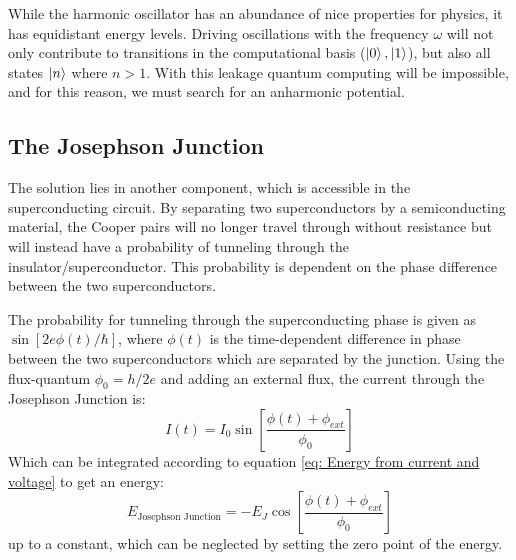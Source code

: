 While the harmonic oscillator has an abundance of nice properties for physics, it has equidistant energy levels. Driving oscillations with the frequency $\omega$ will not only contribute to transitions in the computational basis ($\ket{0}, \ket{1}$), but also all states $\ket{n}$ where $n > 1$. With this leakage quantum computing will be impossible, and for this reason, we must search for an anharmonic potential.

\subsection{The Josephson Junction}
The solution lies in another component, which is accessible in the superconducting circuit. By separating two superconductors by a semiconducting material, the Cooper pairs will no longer travel through without resistance but will instead have a probability of tunneling through the insulator/superconductor. This probability is dependent on the phase difference between the two superconductors. 

The probability for tunneling through the superconducting phase is given as $\sin[2e\phi(t) / \hbar]$, where $\phi(t)$ is the time-dependent difference in phase between the two superconductors which are separated by the junction. Using the flux-quantum $\phi_0 = h / 2e$ and adding an external flux, the current through the Josephson Junction is:
\begin{equation}
    I(t) = I_0 \sin \left[ \frac{\phi(t) + \phi_{ext}}{\phi_0} \right]
\end{equation}
Which can be integrated according to equation \ref{eq: Energy from current and voltage} to get an energy:
\begin{equation}
    E_{\text{Josephson Junction}} = - E_J \cos \left[ \frac{\phi(t) + \phi_{ext}}{\phi_0} \right]
\end{equation}
up to a constant, which can be neglected by setting the zero point of the energy. \cite{vool_introduction_2017}

